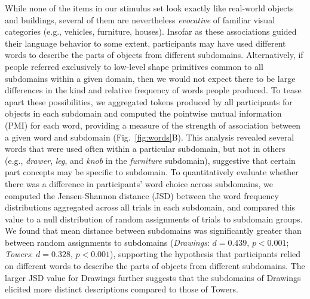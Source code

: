 \documentclass[10pt,letterpaper]{article}
\begin{document}
While none of the items in our stimulus set look exactly like real-world objects and buildings, several of them are nevertheless \textit{evocative} of familiar visual categories (e.g., vehicles, furniture, houses). 
Insofar as these associations guided their language behavior to some extent, participants may have used different words to describe the parts of objects from different subdomains. 
Alternatively, if people referred exclusively to low-level shape primitives common to all subdomains within a given domain, then we would not expect there to be large differences in the kind and relative frequency of words people produced. 
To tease apart these possibilities, we aggregated tokens produced by all participants for objects in each subdomain and computed the pointwise mutual information (PMI) for each word, providing a measure of the strength of association between a given word and subdomain (Fig.~\ref{fig:words}B).
This analysis revealed several words that were used often within a particular subdomain, but not in others (e.g., \textit{drawer}, \textit{leg}, and \textit{knob} in the \textit{furniture} subdomain), suggestive that certain part concepts may be specific to subdomain. 
To quantitatively evaluate whether there was a difference in participants' word choice across subdomains, we computed the Jensen-Shannon distance (JSD) between the word frequency distributions aggregated across all trials in each subdomain, and compared this value to a null distribution of random assignments of trials to subdomain groups.
We found that mean distance between subdomains was significantly greater than between random assignments to subdomains (\textit{Drawings}: $d = 0.439$, $p < 0.001$; \textit{Towers}: $d = 0.328$, $p < 0.001$), supporting the hypothesis that participants relied on different words to describe the parts of objects from different subdomains.
The larger JSD value for Drawings further suggests that the subdomains of Drawings elicited more distinct descriptions compared to those of Towers. %
\end{document}
